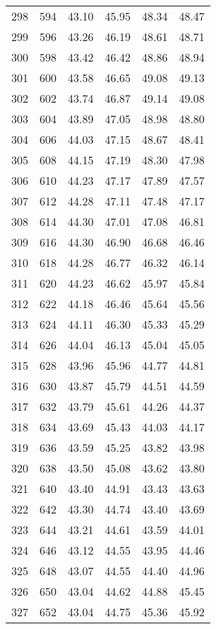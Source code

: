 \begin{longtable}{rrllll}
		298 & 594 & 43.10 & 45.95 & 48.34 & 48.47 \\ 
		299 & 596 & 43.26 & 46.19 & 48.61 & 48.71 \\ 
		300 & 598 & 43.42 & 46.42 & 48.86 & 48.94 \\ 
		301 & 600 & 43.58 & 46.65 & 49.08 & 49.13 \\ 
		302 & 602 & 43.74 & 46.87 & 49.14 & 49.08 \\ 
		303 & 604 & 43.89 & 47.05 & 48.98 & 48.80 \\ 
		304 & 606 & 44.03 & 47.15 & 48.67 & 48.41 \\ 
		305 & 608 & 44.15 & 47.19 & 48.30 & 47.98 \\ 
		306 & 610 & 44.23 & 47.17 & 47.89 & 47.57 \\ 
		307 & 612 & 44.28 & 47.11 & 47.48 & 47.17 \\ 
		308 & 614 & 44.30 & 47.01 & 47.08 & 46.81 \\ 
		309 & 616 & 44.30 & 46.90 & 46.68 & 46.46 \\ 
		310 & 618 & 44.28 & 46.77 & 46.32 & 46.14 \\ 
		311 & 620 & 44.23 & 46.62 & 45.97 & 45.84 \\ 
		312 & 622 & 44.18 & 46.46 & 45.64 & 45.56 \\ 
		313 & 624 & 44.11 & 46.30 & 45.33 & 45.29 \\ 
		314 & 626 & 44.04 & 46.13 & 45.04 & 45.05 \\ 
		315 & 628 & 43.96 & 45.96 & 44.77 & 44.81 \\ 
		316 & 630 & 43.87 & 45.79 & 44.51 & 44.59 \\ 
		317 & 632 & 43.79 & 45.61 & 44.26 & 44.37 \\ 
		318 & 634 & 43.69 & 45.43 & 44.03 & 44.17 \\ 
		319 & 636 & 43.59 & 45.25 & 43.82 & 43.98 \\ 
		320 & 638 & 43.50 & 45.08 & 43.62 & 43.80 \\ 
		321 & 640 & 43.40 & 44.91 & 43.43 & 43.63 \\ 
		322 & 642 & 43.30 & 44.74 & 43.40 & 43.69 \\ 
		323 & 644 & 43.21 & 44.61 & 43.59 & 44.01 \\ 
		324 & 646 & 43.12 & 44.55 & 43.95 & 44.46 \\ 
		325 & 648 & 43.07 & 44.55 & 44.40 & 44.96 \\ 
		326 & 650 & 43.04 & 44.62 & 44.88 & 45.45 \\ 
		327 & 652 & 43.04 & 44.75 & 45.36 & 45.92 \\ 

\end{longtable}
